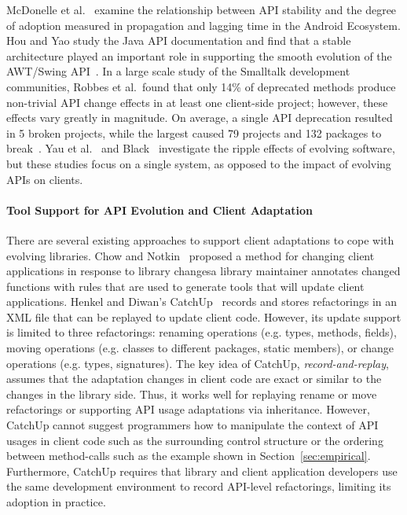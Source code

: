 \documentclass[runningheads,a4paper]{llncs}
\begin{document}
McDonelle et al.~\cite{} examine the relationship between API stability and the degree of adoption measured in propagation and lagging time in the Android Ecosystem. 
Hou and Yao study the Java API documentation and find that a stable architecture played an important role in supporting the smooth evolution of the AWT/Swing API~\cite{Hou2011:api}.  
In a large scale study of the Smalltalk development communities, Robbes et al.~found that only 14\% of deprecated methods produce non-trivial API change effects in at least one client-side project; however, these effects vary greatly in magnitude. On average, a single API deprecation resulted in 5 broken projects, while the largest caused 79 projects and 132 packages to break~\cite{robbes2012}.
Yau et al.~\cite{Yau1978} and Black~\cite{Black2001} investigate the ripple effects of evolving software, but these studies focus on a single system, as opposed to the impact of evolving APIs on clients.


\paragraph{Tool Support for API Evolution and Client Adaptation} 
There are several existing approaches to support client adaptations to cope with evolving libraries.  Chow and Notkin~\cite{Chow1996} proposed a method for changing client applications in response to library changes\textemdash a library maintainer annotates changed functions with rules that are used to generate tools that will update client applications. Henkel and Diwan's CatchUp~\cite{Henkel2005} records and stores refactorings in an XML file that can be replayed to update client code. However, its update support is limited to three refactorings: renaming operations (e.g.  types, methods, fields), moving operations (e.g. classes to different packages, static members), or change operations (e.g. types, signatures). The key idea of CatchUp, {\em record-and-replay}, assumes that the adaptation changes in client code are exact or similar to the changes in the library side. Thus, it works well for replaying rename or move refactorings or supporting API usage adaptations via inheritance. However, CatchUp cannot suggest programmers how to manipulate the context of API usages in client code such as the surrounding control structure or the ordering between method-calls such as the example shown in Section~\ref{sec:empirical}. Furthermore, CatchUp requires that library and client application developers use the same development environment to record API-level refactorings, limiting its adoption in practice.
\end{document}
